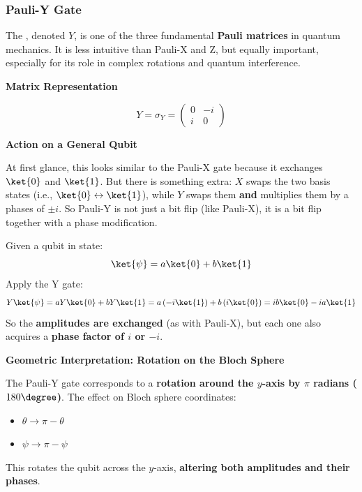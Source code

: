 \subsubsection{Pauli-Y Gate}\label{subsubsection: Pauli-Y Gate}

The , denoted $Y$, is one of the three fundamental \textbf{Pauli matrices} in quantum mechanics. It is less intuitive than Pauli-X and Z, but equally important, especially for its role in complex rotations and quantum interference.

\highspace
\begin{flushleft}
    \textcolor{Green3}{ \textbf{Matrix Representation}}
\end{flushleft}
\begin{equation*}
    Y = \sigma_{Y} = \begin{pmatrix}
        0 & -i \\ i & 0
    \end{pmatrix}
\end{equation*}

\highspace
\begin{flushleft}
    \textcolor{Green3}{ \textbf{Action on a General Qubit}}
\end{flushleft}
At first glance, this looks similar to the Pauli-X gate because it exchanges $\ket{0}$ and $\ket{1}$. But there is something extra: $X$ swaps the two basis states (i.e., $\ket{0} \leftrightarrow \ket{1}$), while $Y$ swaps them \textbf{and} multiplies them by a phases of $\pm i$. So Pauli-Y is not just a bit flip (like Pauli-X), it is a bit flip together with a phase modification.

\highspace
Given a qubit in state:
\begin{equation*}
	\ket{\psi} = a\ket{0} + b\ket{1}
\end{equation*}
Apply the Y gate:
\begin{equation*}
	Y\ket{\psi} = aY\ket{0} + bY\ket{1} = a\left(-i \ket{1}\right) + b\left(i \ket{0}\right) = ib\ket{0} - ia\ket{1}
\end{equation*}
So the \textbf{amplitudes are exchanged} (as with Pauli-X), but each one also acquires a \textbf{phase factor of $i$ or $-i$}.

\highspace
\begin{flushleft}
    \textcolor{Green3}{ \textbf{Geometric Interpretation: Rotation on the Bloch Sphere}}
\end{flushleft}
The Pauli-Y gate corresponds to a \textbf{rotation around the $y$-axis by $\pi$ radians ($180 \degree$)}. The effect on Bloch sphere coordinates:
\begin{itemize}
    \item $\theta \rightarrow \pi - \theta$
    \item $\psi \rightarrow \pi - \psi$
\end{itemize}
This rotates the qubit across the $y$-axis, \textbf{altering both amplitudes and their phases}.

